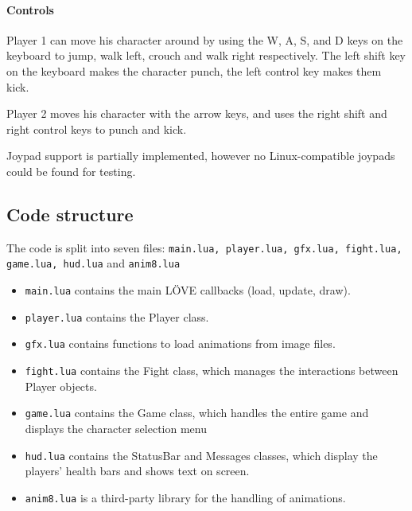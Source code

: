 \documentclass[11pt]{article}
\begin{document}
\paragraph{Controls}
Player 1 can move his character around by using the W, A, S, and D keys on the keyboard to jump, walk left, crouch and walk right respectively. The left shift key on the keyboard makes the character punch, the left control key makes them kick.

Player 2 moves his character with the arrow keys, and uses the right shift and right control keys to punch and kick.

Joypad support is partially implemented, however no Linux-compatible joypads could be found for testing.

\subsection{Code structure}
The code is split into seven files: \texttt{main.lua, player.lua, gfx.lua, fight.lua, game.lua, hud.lua} and \texttt{anim8.lua}
\begin{itemize}[noitemsep]
    \item \texttt{main.lua} contains the main L\"{O}VE callbacks (load, update, draw).
    \item \texttt{player.lua} contains the Player class.
    \item \texttt{gfx.lua} contains functions to load animations from image files.
    \item \texttt{fight.lua} contains the Fight class, which manages the interactions between Player objects.
    \item \texttt{game.lua} contains the Game class, which handles the entire game and displays the character selection menu
    \item \texttt{hud.lua} contains the StatusBar and Messages classes, which display the players' health bars and shows text on screen.
    \item \texttt{anim8.lua} is a third-party library for the handling of animations.
\end{itemize}
\end{document}
